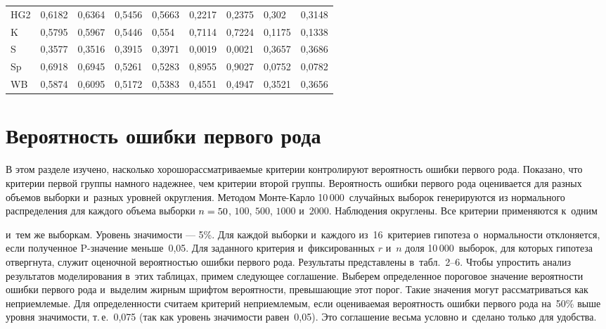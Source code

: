 \begin{multicols}{2}
\begin{table*}[b]
\begin{center}
\begin{tabular}{|l|l|l|l|l|l|l|l|l|}
\hspace*{4mm}HG2&0,6182&0,6364&0,5456&0,5663&0,2217&0,2375&0,302&0,3148\\
\hspace*{4mm}K&0,5795&0,5967&0,5446&0,554&0,7114&0,7224&0,1175&0,1338\\
\hspace*{4mm}S&0,3577&0,3516&0,3915&0,3971&0,0019&0,0021&0,3657&0,3686\\
\hspace*{4mm}Sp&0,6918&0,6945&0,5261&0,5283&0,8955&0,9027&0,0752&0,0782\\
\hspace*{4mm}WB&0,5874&0,6095&0,5172&0,5383&0,4551&0,4947&0,3521&0,3656\\
\hline
\end{tabular}
\end{center}
\end{table*}

\vspace*{-9pt}

\section{Вероятность ошибки первого рода}

\vspace*{-4pt}


В этом разделе изучено, насколько хорошо\linebreak рассматриваемые критерии контролируют вероятность ошибки первого
рода. Показано, что критерии первой группы намного надежнее, чем критерии второй группы. Вероятность ошибки
\mbox{первого} рода оценивается для разных объемов выборки и~разных уровней округления. Методом
Мон\-те-Кар\-ло 10\,000~случайных выборок генерируются из нормального распределения для каждого объема выборки
$n\hm=50$, $100$, $500$, $1000$ и~$2000$. Наблюдения округлены. Все критерии применяются к~одним\linebreak\vspace*{-12pt}

\pagebreak

\noindent
 и~тем же
выборкам. Уровень значимости --- 5\%. Для каждой выборки и~каждого из~16~критериев гипотеза о~нормальности
отклоняется, если полученное P-зна\-че\-ние меньше~0,05. Для заданного критерия и~фиксированных $r$ и~$n$ доля
10\,000~выборок, для которых гипотеза отвергнута, служит оценочной вероятностью ошибки первого рода.
Результаты представлены в~табл.~2--6. Чтобы упростить анализ результатов моделирования в~этих таб\-ли\-цах,
примем следующее соглашение. Выберем определенное пороговое значение вероятности ошибки первого рода и~выделим
жирным шрифтом вероятности, превышающие этот порог. Такие значения могут рассматриваться как неприемлемые. Для
определенности считаем критерий неприемлемым, если оцениваемая вероятность ошибки первого рода на~50\%
выше уровня зна\-чи\-мости, т.\,е.~0,075 (так как уровень значимости равен~0,05).
Это соглашение весьма условно и~сделано только для удобства.
{ %

}
\end{multicols}
